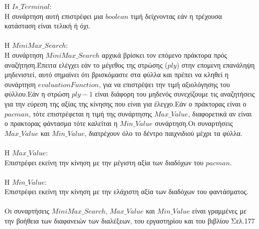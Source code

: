 \documentclass[10pt]{article}
\begin{document}
\hspace{5mm}
H \underline{$Is\_Terminal$}: \\ 

Η συνάρτηση αυτή επιστρέφει μια $boolean$ τιμή δείχνοντας εάν η τρέχουσα κατάσταση είναι τελική ή όχι.\\ \\

\hspace{5mm}
H \underline{$MiniMax\_Search$}: \\

Η συνάρτηση $MiniMax\_Search$ αρχικά βρίσκει τον επόμενο πράκτορα πρός αναζήτηση.Έπειτα ελέγχει εάν το μέγεθος της στρώσης ($ply$) στην επομενη επανάληψη μηδενιστεί, αυτό σημαίνει ότι βρισκόμαστε στα φύλλα και πρέπει να κληθεί η συνάρτηση $evaluationFunction$, για να επιστρέψει την τιμή αξιολόγησης του φύλλου.Εάν η στρώση $ply-1$ είναι διάφορη του μηδενός συνεχίζουμε τις αναζητήσεις για την εύρεση της αξίας της κίνησης που είναι για έλεγχο.Εάν ο  πράκτορας είναι ο $pacman$, τότε επιστρέφεται η τιμή της συνάρτησης $Max\_Value$, διαφορετικά αν είναι ο πρακτορας φάντασμα τότε καλείται η $Min\_Value$ συνάρτηση.Οι συναρτήσεις $Max\_Value$ και $Min\_Value$, διατρέχουν όλο το δέντρο παιχνιδιού μέχρι τα φύλλα.\\ \\

\hspace{5mm}
H \underline{$Max\_Value$}:\\

Επιστρέφει εκείνη την κίνηση με την μέγιστη αξία των διαδόχων του $pacman$.\\ \\

\hspace{5mm}
H \underline{$Min\_Value$}: \\

Επιστρέφει εκείνη την κίνηση με την ελάχιστη αξία των διαδόχων του φαντάσματος.\\ \\

Οι συναρτήσεις $MiniMax\_Search$, $Max\_Value$ και $Min\_Value$ είναι γραμμένες με την  βοήθεια των διαφανειών των διαλέξεων, του εργαστηρίου και του βιβλίου Σελ.177 
\end{document}

